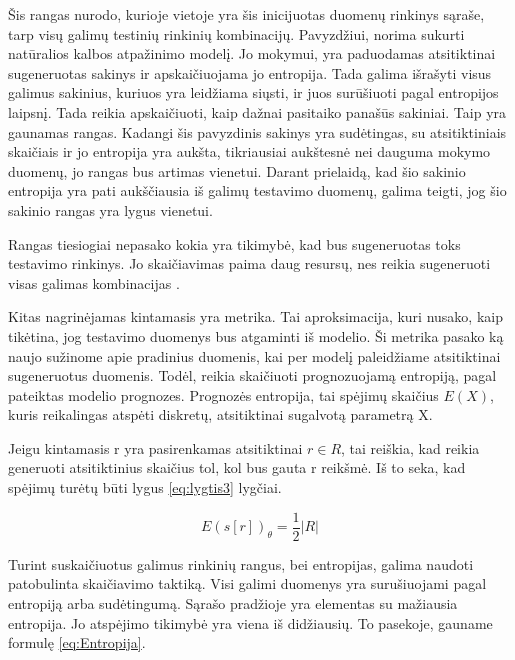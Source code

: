 \documentclass{VUMIFInfBakalaurinis}
\begin{document}
\par Šis rangas nurodo, kurioje vietoje yra šis inicijuotas duomenų rinkinys sąraše, tarp visų galimų testinių rinkinių kombinacijų. Pavyzdžiui, norima 
sukurti natūralios kalbos atpažinimo modelį. Jo mokymui, yra paduodamas atsitiktinai sugeneruotas sakinys  ir apskaičiuojama jo entropija. Tada galima išrašyti visus galimus sakinius, kuriuos yra leidžiama siųsti, ir juos surūšiuoti pagal entropijos laipsnį. Tada reikia apskaičiuoti, kaip dažnai pasitaiko panašūs sakiniai. Taip yra gaunamas rangas. Kadangi šis pavyzdinis sakinys yra sudėtingas, su atsitiktiniais skaičiais ir jo entropija yra aukšta, tikriausiai aukštesnė nei dauguma mokymo duomenų, jo rangas bus artimas vienetui. Darant prielaidą, kad šio sakinio entropija yra pati aukščiausia iš galimų testavimo duomenų, galima teigti, jog šio sakinio rangas yra lygus vienetui.
\par Rangas tiesiogiai nepasako kokia yra tikimybė, kad bus sugeneruotas toks testavimo rinkinys. Jo skaičiavimas paima daug resursų, nes reikia sugeneruoti visas galimas kombinacijas \cite{11}.
\par Kitas nagrinėjamas kintamasis yra  metrika. Tai aproksimacija, kuri nusako, kaip tikėtina, jog testavimo duomenys bus atgaminti iš modelio. Ši metrika pasako ką naujo sužinome apie pradinius duomenis, kai per modelį paleidžiame atsitiktinai sugeneruotus duomenis. Todėl, reikia skaičiuoti prognozuojamą entropiją, pagal pateiktas modelio prognozes. Prognozės entropija, tai spėjimų skaičius $E(X)$, kuris reikalingas atspėti diskretų, atsitiktinai sugalvotą parametrą X.
\par Jeigu kintamasis r yra pasirenkamas atsitiktinai $r \in R$, tai reiškia, kad reikia generuoti atsitiktinius skaičius tol, kol bus gauta r reikšmė. Iš to seka, kad spėjimų turėtų būti lygus \eqref{eq:lygtis3} lygčiai. 

\begin{equation}
E(s[r])_{\theta} = \frac{1}{2} | R |
\label{eq:lygtis3}
\end{equation}

\par Turint suskaičiuotus galimus rinkinių rangus, bei entropijas, galima naudoti patobulinta skaičiavimo taktiką. Visi galimi duomenys yra surušiuojami pagal entropiją arba sudėtingumą. Sąrašo pradžioje yra elementas su mažiausia entropija. Jo atspėjimo tikimybė yra viena iš didžiausių. To pasekoje, gauname formulę \eqref{eq:Entropija}.
\end{document}
